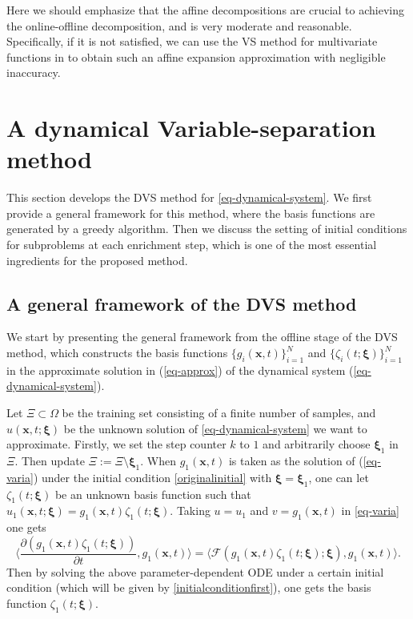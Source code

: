 \documentclass[10pt,a4paper]{article}
\numberwithin{equation}{section}
\numberwithin{lemma}{section}
\numberwithin{example}{section}
\numberwithin{definition}{section}
\numberwithin{assumption}{section}
\numberwithin{theorem}{section}
\numberwithin{proposition}{section}
\numberwithin{corollary}{section}
\numberwithin{remark}{section}
\begin{document}
Here we should emphasize that the affine decompositions are crucial to achieving the online-offline decomposition, 
and  is very moderate and reasonable.  
Specifically, if it is not satisfied, we can use the VS method for multivariate functions in \cite{Li2017a} to obtain such an affine expansion approximation with negligible inaccuracy.



\section{A dynamical Variable-separation method}
\label{sec-dvs}
This section develops the DVS method for \eqref{eq-dynamical-system}. 
We first provide a general framework for this method,
where the basis functions are generated by a greedy algorithm.
Then we discuss the setting of initial conditions for subproblems at each enrichment step, which is one of the most essential ingredients for the proposed method.



\subsection{A general framework of the DVS method}
\label{sec-dvs-framework}
We start by presenting the general framework from the offline stage of the DVS method,
which constructs the basis functions $\{g_i(\bm{x},t)\}_{i=1}^{N}$ and $\{\zeta_i(t;\bm{\xi})\}_{i=1}^{N}$ in the approximate solution in (\ref{eq-approx}) of the dynamical system (\ref{eq-dynamical-system}).

Let $\Xi\subset \Omega$ be the training set consisting of a finite number of samples, and
${u}(\bm{x},t;\bm{\xi})$ be the unknown solution of \eqref{eq-dynamical-system} we want to approximate. 
Firstly, we set the step counter $k$ to $1$ and arbitrarily choose $\bm{\xi}_1$ in $\Xi$.
Then update $\Xi:=\Xi \textbf{\textbackslash} \bm{\xi}_1$. 
When $g_1(\bm{x},t)$ is taken as the solution of (\ref{eq-varia}) under the initial condition \eqref{originalinitial} with $\bm{\xi}=\bm{\xi}_1$, 
one can let $\zeta_1(t;\bm{\xi})$ be an unknown basis function such that 
$u_1(\bm{x},t;\bm{\xi})=g_1(\bm{x},t)\zeta_1(t;\bm{\xi})$. 
Taking $u=u_1$ and $v=g_1(\bm{x},t)$ in \eqref{eq-varia} one gets
\begin{equation}
\label{eq-frame-1}
\Big\langle \frac{\partial (g_1(\bm{x},t)\zeta_1(t;\bm{\xi}))}{\partial t},g_1(\bm{x},t)\Big\rangle=\langle \mathcal{F}(g_1(\bm{x},t)\zeta_1(t;\bm{\xi});\bm{\xi}),g_1(\bm{x},t)\rangle.
\end{equation}
Then by solving the above parameter-dependent ODE under a certain initial condition (which will be given by \eqref{initialconditionfirst}), one gets the basis function $\zeta_1(t;\bm{\xi})$.
\end{document}
